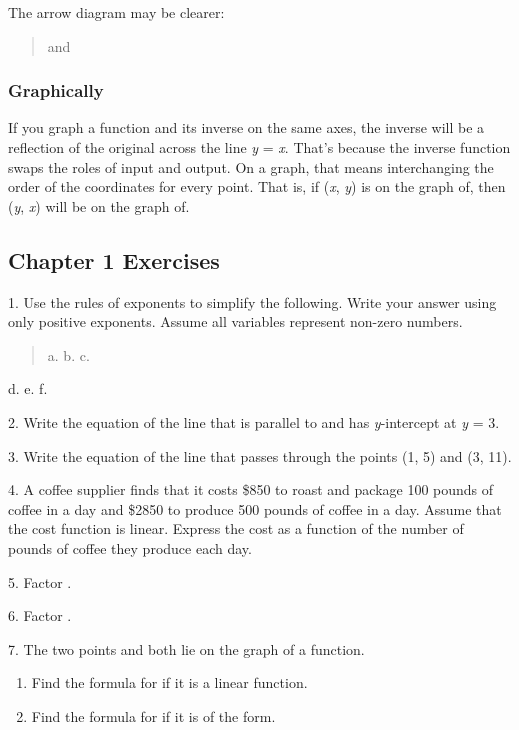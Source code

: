 The arrow diagram may be clearer:

\begin{quote}
and
\end{quote}

\subsubsection{Graphically}\label{graphically}

If you graph a function and its inverse on the same axes, the inverse
will be a reflection of the original across the line \emph{y} =
\emph{x}. That's because the inverse function swaps the roles of input
and output. On a graph, that means interchanging the order of the
coordinates for every point. That is, if (\emph{x}, \emph{y}) is on the
graph of, then (\emph{y}, \emph{x}) will be on the graph of.

\hypertarget{chapter-1-exercises}{\subsection{Chapter 1
Exercises}\label{chapter-1-exercises}}

1. Use the rules of exponents to simplify the following. Write your
answer using only positive exponents. Assume all variables represent
non-zero numbers.

\begin{quote}
a. b. c.
\end{quote}

d. e. f.

2. Write the equation of the line that is parallel to and has
\emph{y}-intercept at \emph{y} = 3.

3. Write the equation of the line that passes through the points (1, 5)
and (3, 11).

4. A coffee supplier finds that it costs \$850 to roast and package 100
pounds of coffee in a day and \$2850 to produce 500 pounds of coffee in
a day. Assume that the cost function is linear. Express the cost as a
function of the number of pounds of coffee they produce each day.

5. Factor .

6. Factor .

7. The two points and both lie on the graph of a function.

\begin{enumerate}
\def\labelenumi{\alph{enumi}.}
\item
  Find the formula for if it is a linear function.
\item
  Find the formula for if it is of the form.
\end{enumerate}

